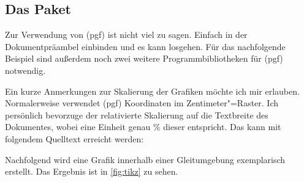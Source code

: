 \documentclass[%
  english,ngerman,%
  geometry=no,DIV=12,automark,%
]{tudscrartcl}
\begin{document}
\subsection{Das Paket }
Zur Verwendung von (pgf) ist nicht viel zu sagen. Einfach in der 
Dokumentpräambel einbinden und es kann losgehen. Für das nachfolgende Beispiel 
sind außerdem noch zwei weitere Programmbibliotheken für (pgf) 
notwendig.
%
\begin{Hint}
\usepackage{tikz}
\usetikzlibrary{chains}
\usetikzlibrary{decorations.markings}
\tikzset{on grid}
\end{Hint}
%
Ein kurze Anmerkungen zur Skalierung der Grafiken möchte ich mir erlauben. 
Normalerweise verwendet (pgf) Koordinaten im Zentimeter"=Raster. 
Ich persönlich bevorzuge der relativierte Skalierung auf die Textbreite des 
Dokumentes, wobei eine Einheit genau \unit[1]{\%} dieser entspricht. Das kann 
mit folgendem Quelltext erreicht werden:
%
\CodeHook{\renewcommand\newlength[1]{}}
\begin{Hint*}
\newlength{\tikzunit}
\setlength{\tikzunit}{.01\textwidth}
\tikzset{x=\tikzunit,y=\tikzunit}
\end{Hint*}
%
Nachfolgend wird eine Grafik innerhalb einer Gleitumgebung exemplarisch 
erstellt. Das Ergebnis ist in \autoref{fig:tikz} zu sehen.
%
\end{document}
